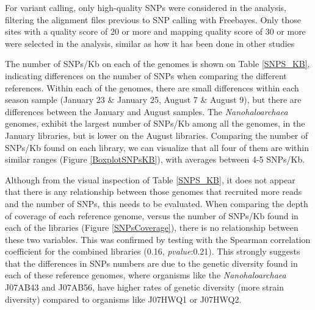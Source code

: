 For variant calling, only high-quality SNPs were considered in the analysis, filtering the alignment files previous to SNP calling with Freebayes. Only those sites with a quality score of 20 or more and mapping quality score of 30 or more were selected in the analysis, similar as how it has been done in other studies \cite{Schloissnig:2012hx}

The number of SNPs/Kb on each of the genomes is shown on Table \ref{SNPS_KB}, indicating differences on the number of SNPs when comparing the different references. Within each of the genomes, there are small differences within each season sample (January 23 \& January 25, August 7 \& August 9), but there are differences between the January and August samples. The \textit{Nanohaloarchaea} genomes, exhibit the largest number of SNPs/Kb among all the genomes, in the January libraries, but is lower on the August libraries. Comparing the number of SNPs/Kb found on each library, we can visualize that all four of them are within similar ranges (Figure \ref{BoxplotSNPsKB}), with averages between 4-5 SNPs/Kb.

Although from the visual inspection of Table \ref{SNPS_KB}, it does not appear that there is any relationship between those genomes that recruited more reads and the number of SNPs, this needs to be evaluated. When comparing the depth of coverage of each reference genome, versus the number of SNPs/Kb found in each of the libraries (Figure \ref{SNPsCoverage}), there is no relationship between these two variables. This was confirmed by testing with the Spearman correlation coefficient for the combined libraries (0.16, \textit{pvalue}:0.21). This strongly suggests that the differences in SNPs numbers are due to the genetic diversity found in each of these reference genomes, where organisms like the \textit{Nanohaloarchaea} J07AB43 and J07AB56, have higher rates of genetic diversity (more strain diversity) compared to organisms like J07HWQ1 or J07HWQ2.

